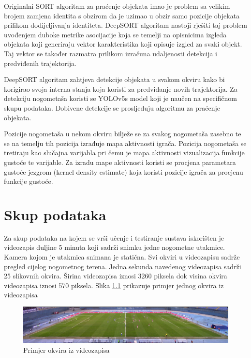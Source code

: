 \documentclass[times, utf8, seminar, numeric]{fer}
\begin{document}
Originalni SORT algoritam za praćenje objekata imao je problem sa velikim brojem zamjena identita s obzirom da je uzimao u obzir samo pozicije objekata prilikom dodijeljivanja identiteta. 
DeepSORT algoritam nastoji rješiti taj problem uvođenjem duboke metrike asocijacije koja se temelji na opisnicima izgleda objekata koji generiraju vektor karakteristika koji opisuje izgled za svaki objekt. Taj vektor se također razmatra prilikom izračuna udaljenosti detekcija i predviđenih trajektorija.

DeepSORT algoritam zahtjeva detekcije objekata u svakom okviru kako bi korigirao svoja interna stanja koja koristi za predviđanje novih trajektorija. Za detekciju nogometaša koristi se YOLOv5s model koji je naučen na specifičnom skupu podataka. 
Dobivene detekcije se prosljeđuju algoritmu za praćenje objekata.

Pozicije nogometaša u nekom okviru bilježe se za svakog nogometaša zasebno te se na temelju tih pozicija izrađuje mapa aktivnosti igrača. Pozicija nogometaša se tretiraju kao slučajna varijabla pri čemu je mapa aktivnosti vizualizacija funkcije gustoće te varijable. Za izradu mape aktivnosti koristi se procjena parametara gustoće jezgrom (kernel density estimate) koja koristi pozicije igrača za procjenu funkcije gustoće.



\chapter{Skup podataka}

Za skup podataka na kojem se vrši učenje i testiranje sustava iskorišten je videozapis duljine 5 minuta koji sadrži snimku jedne nogometne utakmice. Kamera kojom je utakmica snimana je statična. Svi okviri u videozapisu sadrže pregled cijelog nogometnog terena.
Jedna sekunda navedenog videozapisa sadrži 25 slikovnih okvira. 
Širina videozapisa iznosi 3260 piksela dok visina okvira videozapisa iznosi 570 piksela.
Slika \ref{fig:okvir} prikazuje primjer jednog okvira iz videozapisa

\begin{figure}
	\centering
	\includegraphics[width=\linewidth]{slike/okvir.png}
	\caption {Primjer okvira iz videozapisa}
	\label{fig:okvir}	
\end{figure}
\end{document}
